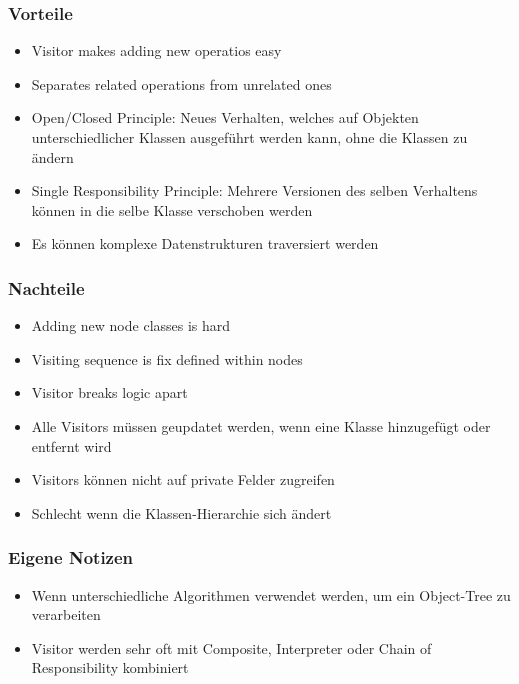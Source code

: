 \subsubsection{Vorteile}
\begin{itemize}[topsep=0pt]
    \itemsep -0.4em
    \item Visitor makes adding new operatios easy
    \item Separates related operations from unrelated ones
    \item Open/Closed Principle: Neues Verhalten, welches auf Objekten unterschiedlicher Klassen ausgeführt werden kann, ohne die Klassen zu ändern
    \item Single Responsibility Principle: Mehrere Versionen des selben Verhaltens können in die selbe Klasse verschoben werden
    \item Es können komplexe Datenstrukturen traversiert werden
\end{itemize}
\subsubsection{Nachteile}
\begin{itemize}[topsep=0pt]
    \itemsep -0.4em
    \item Adding new node classes is hard
    \item Visiting sequence is fix defined within nodes
    \item Visitor breaks logic apart
    \item Alle Visitors müssen geupdatet werden, wenn eine Klasse hinzugefügt oder entfernt wird
    \item Visitors können nicht auf private Felder zugreifen
    \item Schlecht wenn die Klassen-Hierarchie sich ändert
\end{itemize}
\subsubsection{Eigene Notizen}
\begin{itemize}[topsep=0pt]
    \itemsep -0.4em
    \item Wenn unterschiedliche Algorithmen verwendet werden, um ein Object-Tree zu verarbeiten
    \item Visitor werden sehr oft mit Composite, Interpreter oder Chain of Responsibility kombiniert
\end{itemize}
